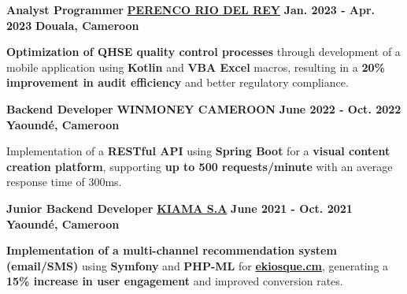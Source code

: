 \begin{cventries}
  \cventry
    {\textbf{Analyst Programmer}} %
    {\textbf{\href{https://www.perenco.com/}{PERENCO RIO DEL REY}}} %
    {\textbf{Jan. 2023 - Apr. 2023}} %
    {\textbf{Douala, Cameroon}} %
    {
      \begin{cvitems} %
        \item {\textbf{Optimization of QHSE quality control processes} through development of a mobile application using \textbf{Kotlin} and \textbf{VBA Excel} macros, resulting in a \textbf{20\% improvement in audit efficiency} and better regulatory compliance.}
      \end{cvitems}
    }

  \cventry
    {\textbf{Backend Developer}} %
    {\textbf{WINMONEY CAMEROON}} %
    {\textbf{June 2022 - Oct. 2022}} %
    {\textbf{Yaoundé, Cameroon}} %
    {
      \begin{cvitems} %
        \item {Implementation of a \textbf{RESTful API} using \textbf{Spring Boot} for a \textbf{visual content creation platform}, supporting \textbf{up to 500 requests/minute} with an average response time of 300ms.}
      \end{cvitems}
    }

  \cventry
    {\textbf{Junior Backend Developer}} %
    {\textbf{\href{https://www.kiama.cm/}{KIAMA S.A}}} %
    {\textbf{June 2021 - Oct. 2021}} %
    {\textbf{Yaoundé, Cameroon}} %
    {
      \begin{cvitems} %
        \item {\textbf{Implementation of a multi-channel recommendation system (email/SMS)} using \textbf{Symfony} and \textbf{PHP-ML} for \textbf{\href{https://ekiosque.cm/}{ekiosque.cm}}, generating a \textbf{15\% increase in user engagement} and improved conversion rates.}
      \end{cvitems}
    }

\end{cventries}